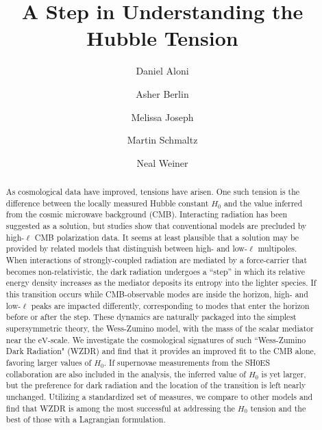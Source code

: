 \documentclass[aps,prd,twocolumn,nofootinbib,superscriptaddress]{revtex4}
\newcommand{\eV}{\text{eV}}
\begin{document}


\title{A Step in Understanding the Hubble Tension}

\author{Daniel Aloni}
\author{Asher Berlin}
\author{Melissa Joseph}
\author{Martin Schmaltz}
\author{Neal Weiner}
\begin{abstract}

As cosmological data have improved, tensions have arisen. One such tension is the difference between the locally measured Hubble constant $H_0$  and the value inferred from the cosmic microwave background (CMB). Interacting radiation has been suggested as a solution, 
but studies show that conventional models are precluded by high-$\ell$ CMB polarization data. It seems at least plausible that a solution may be provided by related models that distinguish between high- and low-$\ell$ multipoles. When interactions of strongly-coupled radiation are mediated by a force-carrier that becomes non-relativistic, the dark radiation undergoes a ``step'' in which its relative energy density increases as the mediator deposits its entropy into the lighter species. If this transition occurs while CMB-observable modes are inside the horizon, high- and low-$\ell$ peaks are impacted differently, corresponding to modes that enter the horizon before or after the step.  These dynamics are naturally packaged into the simplest supersymmetric theory, the Wess-Zumino model, with the mass of the scalar mediator near the $\eV$-scale. We investigate the cosmological signatures of such ``Wess-Zumino Dark Radiation" (WZDR) and find that it provides an improved fit to the CMB alone, favoring larger values of $H_0$. If supernovae  measurements from the SH0ES collaboration are also included in the analysis, the inferred value of $H_0$ is yet larger, but the preference for dark radiation and the location of the transition is left nearly unchanged. Utilizing a standardized set of measures, we compare to other models and find that WZDR is among the most successful at addressing the $H_0$ tension and the best of those with a Lagrangian formulation. 

	
\end{abstract}
\end{document}
